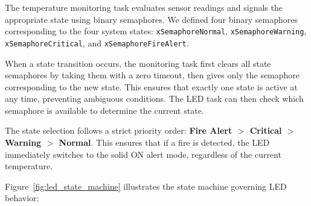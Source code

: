 The temperature monitoring task evaluates sensor readings and signals the appropriate state using binary semaphores. We defined four binary semaphores corresponding to the four system states: \texttt{xSemaphoreNormal}, \texttt{xSemaphoreWarning}, \texttt{xSemaphoreCritical}, and \texttt{xSemaphoreFireAlert}.

When a state transition occurs, the monitoring task first clears all state semaphores by taking them with a zero timeout, then gives only the semaphore corresponding to the new state. This ensures that exactly one state is active at any time, preventing ambiguous conditions. The LED task can then check which semaphore is available to determine the current state.

The state selection follows a strict priority order: \textbf{Fire Alert $>$ Critical $>$ Warning $>$ Normal}. This ensures that if a fire is detected, the LED immediately switches to the solid ON alert mode, regardless of the current temperature.

Figure~\ref{fig:led_state_machine} illustrates the state machine governing LED behavior:

